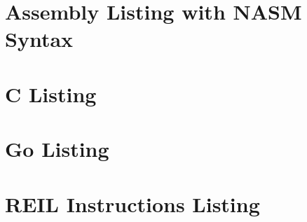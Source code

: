\documentclass[12pt, a4paper]{article}
\begin{document}
\section{Assembly Listing with NASM Syntax}



\section{C Listing}



\pagebreak

\section{Go Listing}



\section{REIL Instructions Listing}


\end{document}
